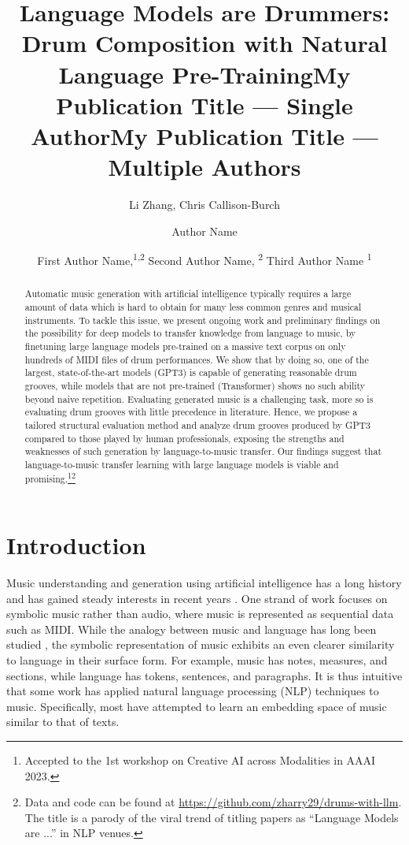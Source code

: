 \documentclass[letterpaper]{article} %
\title{Language Models are Drummers:\\Drum Composition with Natural Language Pre-Training}
\author{
    Li Zhang,
    Chris Callison-Burch
}
\title{My Publication Title --- Single Author}
\author {
    Author Name
}
\title{My Publication Title --- Multiple Authors}
\author {
    First Author Name,\textsuperscript{\rm 1,\rm 2}
    Second Author Name, \textsuperscript{\rm 2}
    Third Author Name \textsuperscript{\rm 1}
}
\begin{document}
\maketitle

\begin{abstract}
Automatic music generation with artificial intelligence typically requires a large amount of data which is hard to obtain for many less common genres and musical instruments. To tackle this issue, we present ongoing work and preliminary findings on the possibility for deep models to transfer knowledge from language to music, by finetuning large language models pre-trained on a massive text corpus on only hundreds of MIDI files of drum performances. We show that by doing so, one of the largest, state-of-the-art models (GPT3) is capable of generating reasonable drum grooves, while models that are not pre-trained (Transformer) shows no such ability beyond naive repetition. Evaluating generated music is a challenging task, more so is evaluating drum grooves with little precedence in literature. Hence, we propose a tailored structural evaluation method and analyze drum grooves produced by GPT3 compared to those played by human professionals, exposing the strengths and weaknesses of such generation by language-to-music transfer. Our findings suggest that language-to-music transfer learning with large language models is viable and promising.\footnote{Accepted to the 1st workshop on Creative AI across Modalities in AAAI 2023.}\footnote{Data and code can be found at \url{https://github.com/zharry29/drums-with-llm}. The title is a parody of the viral trend of titling papers as ``Language Models are ...'' in NLP venues.}
\end{abstract}

\section{Introduction}
Music understanding and generation using artificial intelligence has a long history \cite{roads1985research} and has gained steady interests in recent years \cite{kaliakatsos2020artificial}. One strand of work focuses on symbolic music rather than audio, where music is represented as sequential data such as MIDI. While the analogy between music and language has long been studied \cite{10.1525/mp.2004.21.3.289}, the symbolic representation of music exhibits an even clearer similarity to language in their surface form. For example, music has notes, measures, and sections, while language has tokens, sentences, and paragraphs. It is thus intuitive that some work has applied natural language processing (NLP) techniques to music. Specifically, most have attempted to learn an embedding space of music \cite{liang2020pirhdy} similar to that of texts. 
\end{document}
